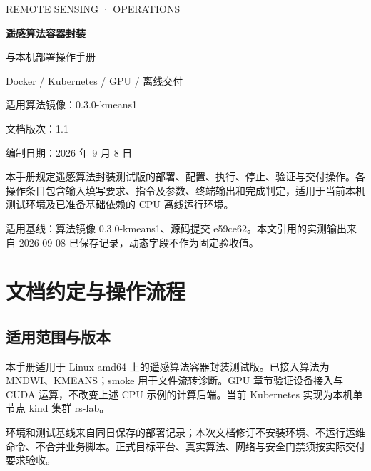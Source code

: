 \documentclass[UTF8,a4paper,11pt,oneside,fontset=none]{ctexrep}
\begin{document}
\begin{titlepage}
\vspace*{22mm}
{\sffamily\color{blue!45!black}\Large REMOTE SENSING · OPERATIONS\par}
\vspace{12mm}
{\sffamily\Huge\bfseries 遥感算法容器封装\par 与本机部署操作手册\par}
\vspace{10mm}
{\Large Docker / Kubernetes / GPU / 离线交付\par}
\vspace{14mm}
{\large 适用算法镜像：0.3.0-kmeans1\par 文档版次：1.1\par 编制日期：2026 年 9 月 8 日\par}
\vfill
\noindent\begin{minipage}{0.95\textwidth}
本手册规定遥感算法封装测试版的部署、配置、执行、停止、验证与交付操作。各操作条目包含输入填写要求、指令及参数、终端输出和完成判定，适用于当前本机测试环境及已准备基础依赖的 CPU 离线运行环境。\par
\vspace{5mm}
适用基线：算法镜像 0.3.0-kmeans1、源码提交 e59ce62。本文引用的实测输出来自 2026-09-08 已保存记录，动态字段不作为固定验收值。
\end{minipage}
\end{titlepage}
\tableofcontents
\clearpage
{}
\chapter{文档约定与操作流程}
\section{适用范围与版本}
本手册适用于 Linux amd64 上的遥感算法容器封装测试版。已接入算法为 MNDWI、KMEANS；smoke 用于文件流转诊断。GPU 章节验证设备接入与 CUDA 运算，不改变上述 CPU 示例的计算后端。当前 Kubernetes 实现为本机单节点 kind 集群 rs-lab。

环境和测试基线来自同日保存的部署记录；本次文档修订不安装环境、不运行运维命令、不合并业务脚本。正式目标平台、真实算法、网络与安全门禁须按实际交付要求验收。
\end{document}
